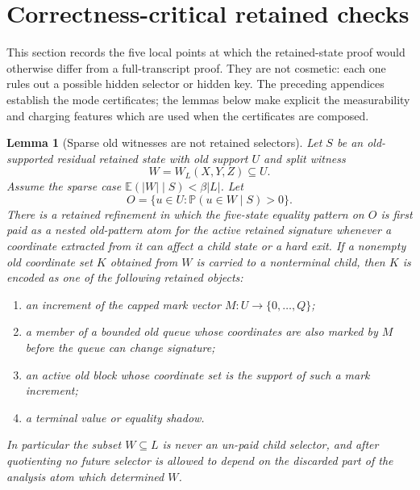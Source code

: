 \documentclass[11pt]{article}
\newtheorem{lemma}[theorem]{Lemma}
\theoremstyle{remark}
\newcommand{\E}{\mathbb E}
\newcommand{\Prob}{\mathbb P}
\begin{document}
\section{Correctness-critical retained checks}\label{app:critical}

This section records the five local points at which the retained-state proof would otherwise differ from a full-transcript proof.  They are not cosmetic: each one rules out a possible hidden selector or hidden key.  The preceding appendices establish the mode certificates; the lemmas below make explicit the measurability and charging features which are used when the certificates are composed.

\begin{lemma}[Sparse old witnesses are not retained selectors]\label{lem:crit-sparse-no-selector}
Let $S$ be an old-supported residual retained state with old support $U$ and split witness
\[
        W=W_L(X,Y,Z)\subseteq U.
\]
Assume the sparse case $\E(|W|\mid S)<\beta |L|$.  Let
\[
        O=\{u\in U:\Prob(u\in W\mid S)>0\}.
\]
There is a retained refinement in which the five-state equality pattern on $O$ is first paid as a nested old-pattern atom for the active retained signature whenever a coordinate extracted from it can affect a child state or a hard exit.  If a nonempty old coordinate set $K$ obtained from $W$ is carried to a nonterminal child, then $K$ is encoded as one of the following retained objects:
\begin{enumerate}[label=\textup{(\alph*)}]
\item an increment of the capped mark vector $M:U\to\{0,\ldots,Q\}$;
\item a member of a bounded old queue whose coordinates are also marked by $M$ before the queue can change signature;
\item an active old block whose coordinate set is the support of such a mark increment;
\item a terminal value or equality shadow.
\end{enumerate}
In particular the subset $W\subseteq L$ is never an un-paid child selector, and after quotienting no future selector is allowed to depend on the discarded part of the analysis atom which determined $W$.
\end{lemma}
\end{document}
